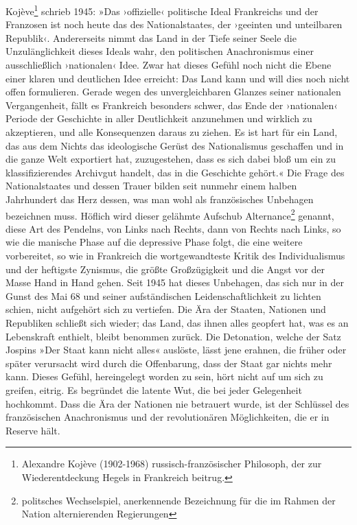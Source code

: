 Kojève\footnote{
Alexandre Kojève (1902-1968) russisch-französischer Philosoph,
der zur Wiederentdeckung Hegels in Frankreich beitrug.
}
schrieb 1945: »Das ›offizielle‹ politische Ideal
Frankreichs und der Franzosen ist noch heute das des
Nationalstaates, der ›geeinten und unteilbaren Republik‹.
Andererseits nimmt das Land in der Tiefe seiner Seele die
Unzulänglichkeit dieses Ideals wahr, den politischen Anachronismus
einer ausschließlich ›nationalen‹ Idee. Zwar hat dieses Gefühl noch
nicht die Ebene einer klaren und deutlichen Idee erreicht: Das Land
kann und will dies noch nicht offen formulieren. Gerade wegen des
unvergleichbaren Glanzes seiner nationalen Vergangenheit, fällt es
Frankreich besonders schwer, das Ende der ›nationalen‹ Periode der
Geschichte in aller Deutlichkeit anzunehmen und wirklich zu
akzeptieren, und alle Konsequenzen daraus zu ziehen. Es ist hart
für ein Land, das aus dem Nichts das ideologische Gerüst des
Nationalismus geschaffen und in die ganze Welt exportiert hat,
zuzugestehen, dass es sich dabei bloß um ein zu klassifizierendes
Archivgut handelt, das in die Geschichte gehört.«
Die Frage des Nationalstaates und dessen Trauer bilden seit nunmehr
einem halben Jahrhundert das Herz dessen, was man wohl als
französisches Unbehagen bezeichnen muss. Höflich wird dieser
gelähmte Aufschub Alternance\footnote{
politsches Wechselspiel, anerkennende Bezeichnung für die im
Rahmen der Nation alternierenden Regierungen
}
genannt, diese Art des Pendelns, von
Links nach Rechts, dann von Rechts nach Links, so wie die manische
Phase auf die depressive Phase folgt, die eine weitere vorbereitet,
so wie in Frankreich die wortgewandteste Kritik des Individualismus
und der heftigste Zynismus, die größte Großzügigkeit und die Angst
vor der Masse Hand in Hand gehen. Seit 1945 hat dieses Unbehagen,
das sich nur in der Gunst des Mai 68 und seiner aufständischen
Leidenschaftlichkeit zu lichten schien, nicht aufgehört sich zu
vertiefen. Die Ära der Staaten, Nationen und Republiken schließt
sich wieder; das Land, das ihnen alles geopfert hat, was es an
Lebenskraft enthielt, bleibt benommen zurück. Die Detonation,
welche der Satz Jospins »Der Staat kann nicht alles« auslöste,
lässt jene erahnen, die früher oder später verursacht wird durch
die Offenbarung, dass der Staat gar nichts mehr kann. Dieses
Gefühl, hereingelegt worden zu sein, hört nicht auf um sich zu
greifen, eitrig. Es begründet die latente Wut, die bei jeder
Gelegenheit hochkommt. Dass die Ära der Nationen nie betrauert
wurde, ist der Schlüssel des französischen Anachronismus und der
revolutionären Möglichkeiten, die er in Reserve hält.

